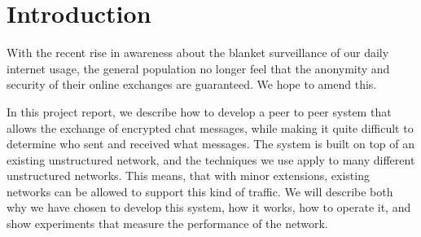 \section{Introduction}
With the recent rise in awareness about the blanket surveillance of our daily internet usage, the general population no longer feel that the anonymity and security of their online exchanges are guaranteed. We hope to amend this. 

In this project report, we describe how to develop a peer to peer system that allows the exchange of  encrypted chat messages, while making it quite difficult to determine who sent and received what messages.
The system is built on top of an existing unstructured network, and the techniques we use apply to many different unstructured networks. This means, that with minor extensions, existing networks can be allowed to support this kind of traffic.
We will describe both why we have chosen to develop this system, how it works, how to operate it, and show experiments that measure the performance of the network.
